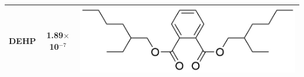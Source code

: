 {\begin{table}
\begin{tabular}{lcc}
DEHP &  1.89$\times$10$^{-7}$   &  \begin{minipage}[c]{0.35\linewidth}\centering
\includegraphics[height=0.07\textheight]{pics/PH/DEHP_struct2.png}\end{minipage}\\ 
\bottomrule
\end{tabular}
\label{tab:PH_structs}
\end{table}

}%



